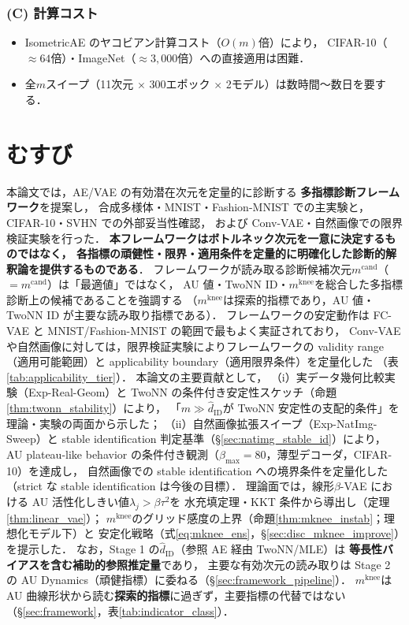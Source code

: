 \documentclass[11pt,a4paper]{jsarticle}
\newcommand{\dzopt}{m^{\mathrm{cand}}}
\newcommand{\mknee}{m^{\mathrm{knee}}}
\begin{document}
\subsubsection*{(C) 計算コスト}

\begin{itemize}
  \item IsometricAE のヤコビアン計算コスト（$O(m)$倍）により，
        CIFAR-10（$\approx 64$倍）・ImageNet（$\approx 3{,}000$倍）への直接適用は困難．
  \item 全$m$スイープ（11次元 $\times$ 300エポック $\times$ 2モデル）は数時間〜数日を要する．
\end{itemize}

\section{むすび}\label{sec:conclusion}

本論文では，AE/VAE の有効潜在次元を定量的に診断する
\textbf{多指標診断フレームワーク}を提案し，
合成多様体・MNIST・Fashion-MNIST での主実験と，CIFAR-10・SVHN での外部妥当性確認，
および Conv-VAE・自然画像での限界検証実験を行った．
\textbf{本フレームワークはボトルネック次元を一意に決定するものではなく，
各指標の頑健性・限界・適用条件を定量的に明確化した診断的解釈論を提供するものである}．
フレームワークが読み取る診断候補次元$\dzopt$（$= m^{\mathrm{cand}}$）は「最適値」ではなく，
AU 値・TwoNN ID・$\mknee$を総合した多指標診断上の候補であることを強調する
（$\mknee$は探索的指標であり，AU 値・TwoNN ID が主要な読み取り指標である）．
フレームワークの安定動作は FC-VAE と MNIST/Fashion-MNIST の範囲で最もよく実証されており，
Conv-VAE や自然画像に対しては，限界検証実験によりフレームワークの
validity range（適用可能範囲）と applicability boundary（適用限界条件）を定量化した
（表\ref{tab:applicability_tier}）．
本論文の主要貢献として，
（i）実データ幾何比較実験（Exp-Real-Geom）と TwoNN の条件付き安定性スケッチ（命題\ref{thm:twonn_stability}）により，
「$m \gg \hat{d}_\mathrm{ID}$が TwoNN 安定性の支配的条件」を理論・実験の両面から示した；
（ii）自然画像拡張スイープ（Exp-NatImg-Sweep）と stable identification 判定基準（§\ref{sec:natimg_stable_id}）により，
AU plateau-like behavior の条件付き観測（$\beta_{\max}=80$，薄型デコーダ，CIFAR-10）を達成し，
自然画像での stable identification への境界条件を定量化した（strict な stable identification は今後の目標）．
理論面では，線形$\beta$-VAE における AU 活性化しきい値$\lambda_j > \beta\tau^2$を
水充填定理・KKT 条件から導出し（定理\ref{thm:linear_vae}）；
$\mknee$のグリッド感度の上界（命題\ref{thm:mknee_instab}；理想化モデル下）と
安定化戦略（式\eqref{eq:mknee_ens}，§\ref{sec:disc_mknee_improve}）を提示した．
なお，Stage 1 の$\hat{d}_\mathrm{ID}$（参照 AE 経由 TwoNN/MLE）は
\textbf{等長性バイアスを含む補助的参照推定量}であり，
主要な有効次元の読み取りは Stage 2 の AU Dynamics（頑健指標）に委ねる（§\ref{sec:framework_pipeline}）．
$\mknee$は AU 曲線形状から読む\textbf{探索的指標}に過ぎず，主要指標の代替ではない（§\ref{sec:framework}，表\ref{tab:indicator_class}）．
\end{document}
